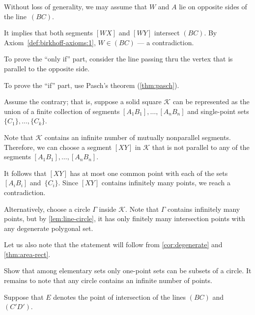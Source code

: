 Without  loss of generality, we may assume that $W$ and $A$ lie on opposite sides of the line~$(BC)$.

It implies that both segments $[WX]$ and $[WY]$ intersect $(BC)$.
By Axiom~\ref{def:birkhoff-axioms:1}, $W\in (BC)$ --- a contradiction.


To prove the ``only if'' part, consider the line passing thru the vertex that is parallel to the opposite side.

To prove the ``if'' part, use Pasch's theorem (\ref{thm:pasch}).

Assume the contrary; that is, suppose a solid square \( \mathcal{K} \) can be represented as the union of a finite collection of segments \( [A_1B_1],\dots,[A_nB_n] \)
and single-point sets \( \{C_1\},\dots,\{C_k\} \).

Note that \( \mathcal{K} \) contains an infinite number of mutually nonparallel segments.
Therefore, we can choose a segment \( [XY] \) in \( \mathcal{K} \) that is not parallel to any of the segments \( [A_1B_1],\dots,[A_nB_n] \).

It follows that \( [XY] \) has at most one common point with each of the sets \( [A_iB_i] \) and~\( \{C_i\} \).
Since \( [XY] \) contains infinitely many points, we reach a contradiction.

\smallskip

Alternatively, choose a circle \( \Gamma \) inside \( \mathcal{K} \).
Note that \( \Gamma \) contains infinitely many points, but by \ref{lem:line-circle}, it has only finitely many intersection points with any degenerate polygonal set.

Let us also note that the statement will follow from \ref{cor:degenerate} and \ref{thm:area-rect}.

Show that among elementary sets
only one-point sets can be subsets of a circle.
It remains to note that any circle contains an infinite number of points.

Suppose that $E$ denotes the point of intersection of the lines $(BC)$ and~$(C'D')$.


